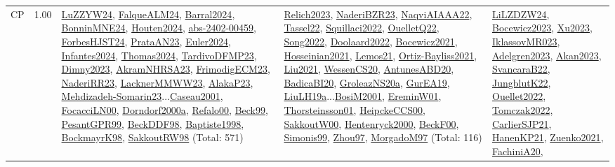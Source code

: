 {\begin{longtable}{p{3cm}r>{\raggedright\arraybackslash}p{6cm}>{\raggedright\arraybackslash}p{6cm}>{\raggedright\arraybackslash}p{8cm}}
\index{CP}\index{CP!CP}CP &  1.00 & \hyperref[detail:LuZZYW24]{LuZZYW24}, \hyperref[detail:FalqueALM24]{FalqueALM24}, \hyperref[detail:Barral2024]{Barral2024}, \hyperref[detail:BonninMNE24]{BonninMNE24}, \hyperref[detail:Houten2024]{Houten2024}, \hyperref[detail:abs-2402-00459]{abs-2402-00459}, \hyperref[detail:ForbesHJST24]{ForbesHJST24}, \hyperref[detail:PrataAN23]{PrataAN23}, \hyperref[detail:Euler2024]{Euler2024}, \hyperref[detail:Infantes2024]{Infantes2024}, \hyperref[detail:Thomas2024]{Thomas2024}, \hyperref[detail:TardivoDFMP23]{TardivoDFMP23}, \hyperref[detail:Dimny2023]{Dimny2023}, \hyperref[detail:AkramNHRSA23]{AkramNHRSA23}, \hyperref[detail:FrimodigECM23]{FrimodigECM23}, \hyperref[detail:NaderiRR23]{NaderiRR23}, \hyperref[detail:LacknerMMWW23]{LacknerMMWW23}, \hyperref[detail:AlakaP23]{AlakaP23}, \hyperref[detail:Mehdizadeh-Somarin23]{Mehdizadeh-Somarin23}...\hyperref[detail:Caseau2001]{Caseau2001}, \hyperref[detail:FocacciLN00]{FocacciLN00}, \hyperref[detail:Dorndorf2000a]{Dorndorf2000a}, \hyperref[detail:Refalo00]{Refalo00}, \hyperref[detail:Beck99]{Beck99}, \hyperref[detail:PesantGPR99]{PesantGPR99}, \hyperref[detail:BeckDDF98]{BeckDDF98}, \hyperref[detail:Baptiste1998]{Baptiste1998}, \hyperref[detail:BockmayrK98]{BockmayrK98}, \hyperref[detail:SakkoutRW98]{SakkoutRW98} (Total: 571) & \hyperref[detail:Relich2023]{Relich2023}, \hyperref[detail:NaderiBZR23]{NaderiBZR23}, \hyperref[detail:NaqviAIAAA22]{NaqviAIAAA22}, \hyperref[detail:Tassel22]{Tassel22}, \hyperref[detail:Squillaci2022]{Squillaci2022}, \hyperref[detail:OuelletQ22]{OuelletQ22}, \hyperref[detail:Song2022]{Song2022}, \hyperref[detail:Doolaard2022]{Doolaard2022}, \hyperref[detail:Bocewicz2021]{Bocewicz2021}, \hyperref[detail:Hosseinian2021]{Hosseinian2021}, \hyperref[detail:Lemos21]{Lemos21}, \hyperref[detail:Ortiz-Bayliss2021]{Ortiz-Bayliss2021}, \hyperref[detail:Liu2021]{Liu2021}, \hyperref[detail:WessenCS20]{WessenCS20}, \hyperref[detail:AntunesABD20]{AntunesABD20}, \hyperref[detail:BadicaBI20]{BadicaBI20}, \hyperref[detail:GroleazNS20a]{GroleazNS20a}, \hyperref[detail:GurEA19]{GurEA19}, \hyperref[detail:LiuLH19a]{LiuLH19a}...\hyperref[detail:BosiM2001]{BosiM2001}, \hyperref[detail:EreminW01]{EreminW01}, \hyperref[detail:Thorsteinsson01]{Thorsteinsson01}, \hyperref[detail:HeipckeCCS00]{HeipckeCCS00}, \hyperref[detail:SakkoutW00]{SakkoutW00}, \hyperref[detail:Hentenryck2000]{Hentenryck2000}, \hyperref[detail:BeckF00]{BeckF00}, \hyperref[detail:Simonis99]{Simonis99}, \hyperref[detail:Zhou97]{Zhou97}, \hyperref[detail:MorgadoM97]{MorgadoM97} (Total: 116) & \hyperref[detail:LiLZDZW24]{LiLZDZW24}, \hyperref[detail:Bocewicz2023]{Bocewicz2023}, \hyperref[detail:Xu2023]{Xu2023}, \hyperref[detail:IklassovMR023]{IklassovMR023}, \hyperref[detail:Adelgren2023]{Adelgren2023}, \hyperref[detail:Akan2023]{Akan2023}, \hyperref[detail:SvancaraB22]{SvancaraB22}, \hyperref[detail:JungblutK22]{JungblutK22}, \hyperref[detail:Ouellet2022]{Ouellet2022}, \hyperref[detail:Tomczak2022]{Tomczak2022}, \hyperref[detail:CarlierSJP21]{CarlierSJP21}, \hyperref[detail:HanenKP21]{HanenKP21}, \hyperref[detail:Zuenko2021]{Zuenko2021}, \hyperref[detail:FachiniA20]{FachiniA20}, 
\end{longtable}}
